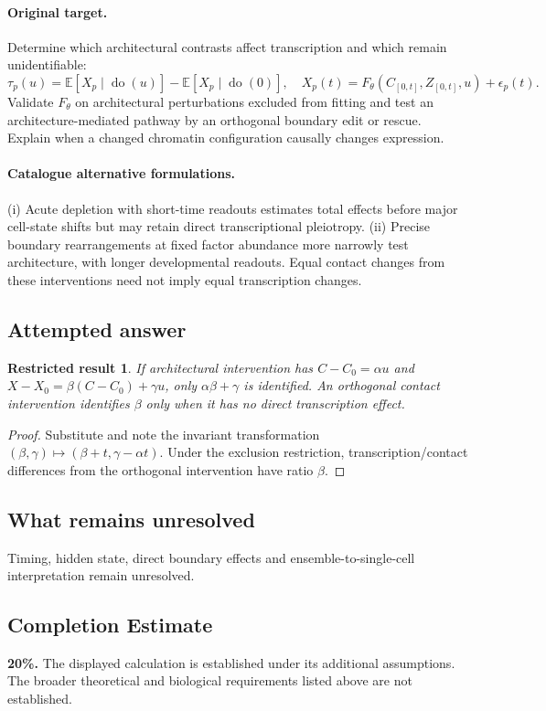 \documentclass[11pt]{article}
\newcommand{\E}{\mathbb E}
\providecommand{\E}{\mathbb E}
\newtheorem{attemptresult}{Restricted result}[section]
\begin{document}
\paragraph{Original target.}
Determine which architectural contrasts affect transcription and which remain unidentifiable:
\[
\tau_{p}(u)=\E[X_p\mid\operatorname{do}(u)]-\E[X_p\mid\operatorname{do}(0)],
\quad X_p(t)=F_\theta(C_{[0,t]},Z_{[0,t]},u)+\epsilon_p(t).
\]
Validate $F_\theta$ on architectural perturbations excluded from fitting and test an architecture-mediated pathway by an orthogonal boundary edit or rescue. Explain when a changed chromatin configuration causally changes expression.
\paragraph{Catalogue alternative formulations.}
(i) Acute depletion with short-time readouts estimates total effects before major cell-state shifts but may retain direct transcriptional pleiotropy. (ii) Precise boundary rearrangements at fixed factor abundance more narrowly test architecture, with longer developmental readouts. Equal contact changes from these interventions need not imply equal transcription changes.
\subsection{Attempted answer}
\begin{attemptresult}
If architectural intervention has $C-C_0=\alpha u$ and $X-X_0=\beta(C-C_0)+\gamma u$, only $\alpha\beta+\gamma$ is identified. An orthogonal contact intervention identifies $\beta$ only when it has no direct transcription effect.
\end{attemptresult}
\begin{proof}
Substitute and note the invariant transformation $(\beta,\gamma)\mapsto(\beta+t,\gamma-\alpha t)$. Under the exclusion restriction, transcription/contact differences from the orthogonal intervention have ratio $\beta$.
\end{proof}
\subsection{What remains unresolved}
Timing, hidden state, direct boundary effects and ensemble-to-single-cell interpretation remain unresolved.
\subsection{Completion Estimate}
\textbf{20\%.} The displayed calculation is established under its additional assumptions. The broader theoretical and biological requirements listed above are not established.
\end{document}

